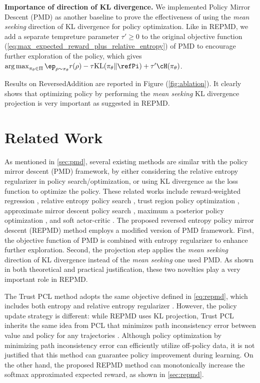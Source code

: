 \documentclass{article}
\DeclareMathOperator*{\argmax}{arg\,max}
\begin{document}
\textbf{Importance of direction of KL divergence.} We implemented Policy Mirror Descent (PMD) as another baseline to prove the effectiveness of using the \emph{mean seeking} direction of KL divergence for policy optimization. Like in REPMD, we add a separate tempreture parameter $\tau'\geq 0$ to the original objective function (\ref{eq:max_expected_reward_plus_relative_entropy}) of PMD to encourage further exploration of the policy, which gives $\argmax_{\pi_\theta \in \Pi}{ \ep_{\rho \sim \pi_\theta}{  r(\rho)  - \tau \text{KL}(\pi_\theta \| \refPi) } + \tau'\cH(\pi_\theta) }$.

Results on ReversedAddition are reported in Figure (\ref{fig:ablation}). It clearly shows that optimizing policy by performing the \emph{mean seeking} KL divergence projection is very important as suggested in REPMD. 

\section{Related Work}
\label{related_work}
As mentioned in \cref{sec:pmd}, several existing methods are similar with the policy mirror descent (PMD) framework, by either considering the relative entropy regularizer in policy search/optimization, or using KL divergence as the loss function to optimize the policy. These related works include reward-weighted regression \cite{peters2007reinforcement,wierstra2008episodic}, relative entropy policy search \cite{peters2010relative}, trust region policy optimization \cite{schulman2015trust}, approximate mirror descent policy search \cite{montgomery2016guided}, maximum a posterior policy optimization \cite{abdolmaleki2018maximum}, and soft actor-critic \cite{haarnoja2018soft}. The proposed reversed entropy policy mirror descent (REPMD) method employs a modified version of PMD framework. First, the objective function of PMD is combined with entropy regularizer to enhance further exploration. Second, the projection step applies the \emph{mean seeking} direction of KL divergence instead of the \emph{mean seeking} one used PMD. As shown in both theoretical and practical justification, these two novelties play a very important role in REPMD. 

The Trust PCL method adopts the same objective defined in \cref{eq:repmd}, which includes both entropy and relative entropy regularizer \cite{nachum2017trust}. However, the policy update strategy is different: while REPMD uses KL projection, Trust PCL inherits the same idea from PCL that minimizes path inconsistency error between value and policy for any trajectories \cite{nachum2017bridging}. Although policy optimization by minimizing path inconsistency error can efficiently utilize off-policy data, it is not justified that this method can guarantee policy improvement during learning. On the other hand, the proposed REPMD method can monotonically increase the softmax approximated expected reward, as shown in \cref{sec:repmd}.
\end{document}
